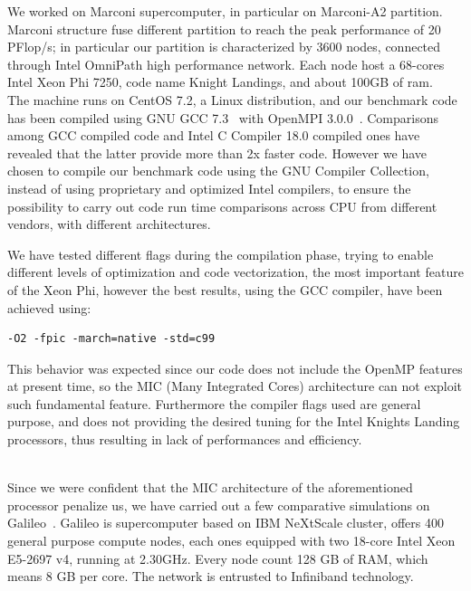 We worked on Marconi\cite{marconi:specs} supercomputer, in particular on Marconi-A2 partition.
Marconi structure fuse different partition to reach the peak performance of 20 PFlop/s; in particular our partition is characterized by 3600 nodes, connected through Intel OmniPath\cite{intel:intelmpivsopenmpi} high performance network. Each node host a 68-cores Intel Xeon Phi 7250, code name Knight Landings, and about 100GB of ram. \\
The machine runs on CentOS 7.2, a Linux distribution, and our benchmark code has been compiled using GNU GCC 7.3~\cite{gcc} with OpenMPI 3.0.0~\cite{openmpi}\cite{MPI:standard3}. Comparisons among GCC compiled code and Intel C Compiler 18.0 compiled ones have revealed that the latter provide more than 2x faster code. However we have chosen to compile our benchmark code using the GNU Compiler Collection, instead of using proprietary and optimized Intel compilers, to ensure the possibility to carry out code run time comparisons across CPU from different vendors, with different architectures. 
\par
We have tested different flags during the compilation phase, trying to enable different levels of optimization and code vectorization, the most important feature of the Xeon Phi, however the best results, using the GCC compiler, have been achieved using:
\begin{lstlisting}
-O2 -fpic -march=native -std=c99
\end{lstlisting}
This behavior was expected since our code does not include the OpenMP\cite{openmp} features at present time, so the MIC\cite{mic} (Many Integrated Cores) architecture can not exploit such fundamental feature. Furthermore the compiler flags used are general purpose, and does not providing the desired tuning for the Intel Knights Landing processors, thus resulting in lack of performances and efficiency.\\~\par
Since we were confident that the MIC architecture of the aforementioned processor penalize us, we have carried out a few comparative simulations on Galileo~\cite{galileo:specs}.
Galileo is supercomputer based on IBM NeXtScale cluster, offers 400 general purpose compute nodes, each ones equipped with two 18-core Intel Xeon E5-2697 v4, running at 2.30GHz. Every node count 128 GB of RAM, which means 8 GB per core. The network is entrusted to Infiniband technology.

